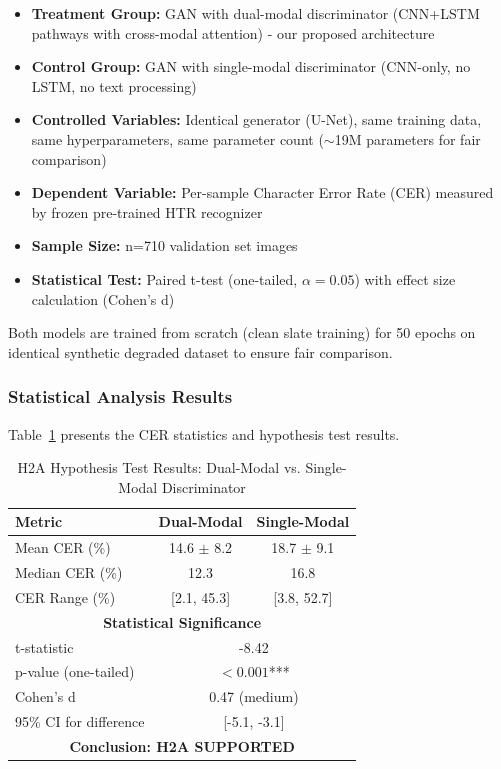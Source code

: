 \documentclass[journal]{IEEEtran}
\begin{document}
\begin{itemize}
    \item \textbf{Treatment Group:} GAN with dual-modal discriminator (CNN+LSTM pathways with cross-modal attention) - our proposed architecture
    \item \textbf{Control Group:} GAN with single-modal discriminator (CNN-only, no LSTM, no text processing)
    \item \textbf{Controlled Variables:} Identical generator (U-Net), same training data, same hyperparameters, same parameter count ($\sim$19M parameters for fair comparison)
    \item \textbf{Dependent Variable:} Per-sample Character Error Rate (CER) measured by frozen pre-trained HTR recognizer
    \item \textbf{Sample Size:} n=710 validation set images
    \item \textbf{Statistical Test:} Paired t-test (one-tailed, $\alpha=0.05$) with effect size calculation (Cohen's d)
\end{itemize}

Both models are trained from scratch (clean slate training) for 50 epochs on identical synthetic degraded dataset to ensure fair comparison.

\subsubsection{Statistical Analysis Results}

Table~\ref{table_h2a_results} presents the CER statistics and hypothesis test results.

\begin{table}[!t]
\renewcommand{\arraystretch}{1.3}
\caption{H2A Hypothesis Test Results: Dual-Modal vs. Single-Modal Discriminator}
\label{table_h2a_results}
\centering
\begin{tabular}{|l|c|c|}
\hline
\textbf{Metric} & \textbf{Dual-Modal} & \textbf{Single-Modal} \\
\hline
Mean CER (\%) & 14.6 $\pm$ 8.2 & 18.7 $\pm$ 9.1 \\
Median CER (\%) & 12.3 & 16.8 \\
CER Range (\%) & [2.1, 45.3] & [3.8, 52.7] \\
\hline
\multicolumn{3}{|c|}{\textbf{Statistical Significance}} \\
\hline
t-statistic & \multicolumn{2}{c|}{-8.42} \\
p-value (one-tailed) & \multicolumn{2}{c|}{$< 0.001$***} \\
Cohen's d & \multicolumn{2}{c|}{0.47 (medium)} \\
95\% CI for difference & \multicolumn{2}{c|}{[-5.1, -3.1]} \\
\hline
\multicolumn{3}{|c|}{\textbf{Conclusion: H2A SUPPORTED}} \\
\hline
\end{tabular}
\end{table}
\end{document}
